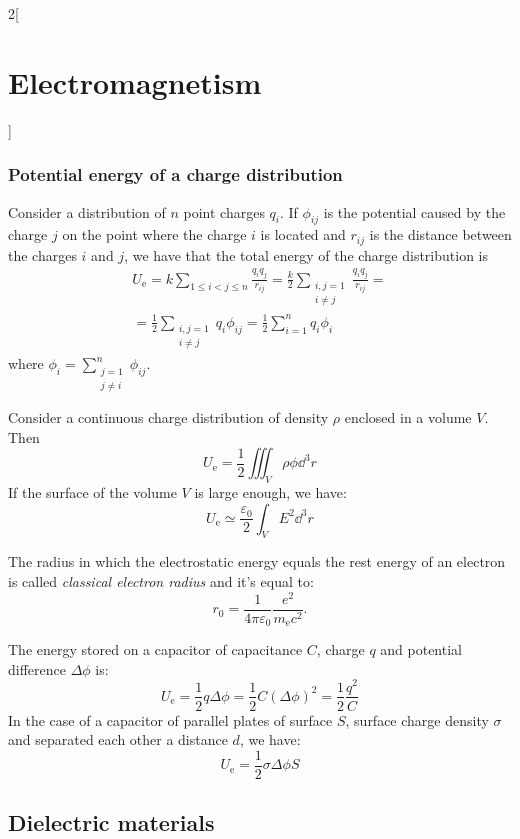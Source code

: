 \documentclass[../../../main.tex]{subfiles}
\begin{document}
\begin{multicols}{2}[\section{Electromagnetism}]
  \subsubsection{Potential energy of a charge distribution}
  \begin{prop}
    Consider a distribution of $n$ point charges $q_i$. If $\phi_{ij}$ is the potential caused by the charge $j$ on the point where the charge $i$ is located and $r_{ij}$ is the distance between the charges $i$ and $j$, we have that the total energy of the charge distribution is
    \begin{multline*}
      U_\text{e}=k\sum_{1\leq i<j\leq n}\frac{q_iq_j}{r_{ij}}=\frac{k}{2}\sum_{\substack{i,j=1\\i\ne j}}\frac{q_iq_j}{r_{ij}}=\\
      =\frac{1}{2}\sum_{\substack{i,j=1\\i\ne j}}q_i\phi_{ij}=\frac{1}{2}\sum_{i=1}^nq_i\phi_i
    \end{multline*}
    where $\displaystyle\phi_i=\sum_{\substack{j=1\\j\ne i}}^n\phi_{ij}$.
  \end{prop}
  \begin{prop}
    Consider a continuous charge distribution of density $\rho$ enclosed in a volume $V$. Then $$U_\text{e}=\frac{1}{2}\iiint_V\rho\phi \dd^3r$$
    If the surface of the volume $V$ is large enough, we have: $$U_\text{e}\simeq\frac{\varepsilon_0}{2}\int_VE^2\dd^3r$$
  \end{prop}
  \begin{definition}
    The radius in which the electrostatic energy equals the rest energy of an electron is called \emph{classical electron radius} and it's equal to: $$r_0=\frac{1}{4\pi\varepsilon_0}\frac{e^2}{m_\text{e}c^2}.$$
  \end{definition}
  \begin{prop}
    The energy stored on a capacitor of capacitance $C$, charge $q$ and potential difference $\Delta\phi$ is: $$U_\text{e}=\frac{1}{2}q\Delta \phi=\frac{1}{2}C{\left(\Delta\phi\right)}^2=\frac{1}{2}\frac{q^2}{C}$$ In the case of a capacitor of parallel plates of surface $S$, surface charge density $\sigma$ and separated each other a distance $d$, we have: $$U_\text{e}=\frac{1}{2}\sigma\Delta\phi S$$
  \end{prop}
  \subsection{Dielectric materials}

\end{multicols}
\end{document}
